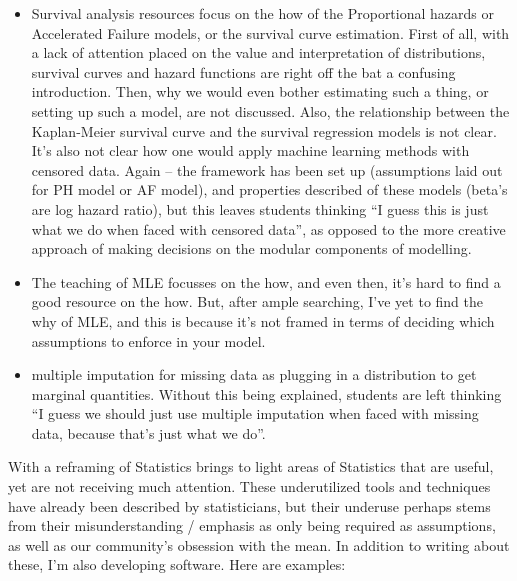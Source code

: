 \documentclass[]{article}
\providecommand{\tightlist}{%
  \setlength{\itemsep}{0pt}\setlength{\parskip}{0pt}}
\begin{document}
\begin{itemize}
\tightlist
\item
  Survival analysis resources focus on the how of the Proportional hazards or Accelerated Failure models, or the survival curve estimation. First of all, with a lack of attention placed on the value and interpretation of distributions, survival curves and hazard functions are right off the bat a confusing introduction. Then, why we would even bother estimating such a thing, or setting up such a model, are not discussed. Also, the relationship between the Kaplan-Meier survival curve and the survival regression models is not clear. It's also not clear how one would apply machine learning methods with censored data. Again -- the framework has been set up (assumptions laid out for PH model or AF model), and properties described of these models (beta's are log hazard ratio), but this leaves students thinking ``I guess this is just what we do when faced with censored data'', as opposed to the more creative approach of making decisions on the modular components of modelling.
\item
  The teaching of MLE focusses on the how, and even then, it's hard to find a good resource on the how. But, after ample searching, I've yet to find the why of MLE, and this is because it's not framed in terms of deciding which assumptions to enforce in your model.
\item
  multiple imputation for missing data as plugging in a distribution to get marginal quantities. Without this being explained, students are left thinking ``I guess we should just use multiple imputation when faced with missing data, because that's just what we do''.
\end{itemize}

With a reframing of Statistics brings to light areas of Statistics that are useful, yet are not receiving much attention. These underutilized tools and techniques have already been described by statisticians, but their underuse perhaps stems from their misunderstanding / emphasis as only being required as assumptions, as well as our community's obsession with the mean. In addition to writing about these, I'm also developing software. Here are examples:
\end{document}
